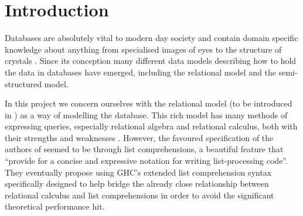 \chapter{Introduction} %
\begin{comment}
It’s a good idea to *try* to write the introduction to your final report early on in the project. However, you will find it hard, as you won’t yet have a complete story and you won’t know what your main contributions are going to be. However, the exercise is useful as it will tell you what you *don’t* yet know and thus what questions your project should aim to answer. For the interim report this section should be a short, succinct, summary of the project’s main objectives. Some of this material may be re-usable in your final report, but the chances are that your final introduction will be quite different.  You are therefore advised to keep this part of the interim report short, focusing on the following questions: What is the problem, why is it interesting and what’s your main idea for solving it?  (DON'T use those three questions as subheadings however!  The answers should emerge from what you write.)
\end{comment}

Databases are absolutely vital to modern day society and contain domain specific knowledge about anything from specialised images of eyes  to the structure of crystals \cite{CambridgeStructuralDatabase}. Since its conception many different data models describing how to hold the data in databases have emerged, including the relational model \cite{RelationalModel} and the semi-structured model\cite{DatabaseSystems}.

In this project we concern ourselves with the relational model (to be introduced in ) as a way of modelling the database. This rich model has many methods of expressing queries, especially relational algebra and relational calculus, both with their strengths and weaknesses \cite{RelationalCalculus,RelationalModel}.  However, the favoured specification of the authors of \cite{RelationalAlgebraByWayOfAdjunctions} seemed to be through list comprehensions, a beautiful feature that ``provide for a concise and expressive notation for writing list-processing code''. \cite{MonadComprehensions} They eventually propose using GHC's extended list comprehension syntax specifically designed to help bridge the already close relationship between relational calculus and list comprehensions \cite{GHCListComprehension,ComprehensiveComprehensions} in order to avoid the significant theoretical performance hit.

